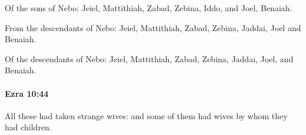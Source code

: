 			\begin{versebox}
					\item[BHS] 
					\item[LXX] 
					\item[ASV] Of the sons of Nebo: Jeiel, Mattithiah, Zabad, Zebina, Iddo, and Joel, Benaiah.
					\item[NIV] From the descendants of Nebo: Jeiel, Mattithiah, Zabad, Zebina, Jaddai, Joel and Benaiah.
					\item[NRSV] Of the descendants of Nebo: Jeiel, Mattithiah, Zabad, Zebina, Jaddai, Joel, and Benaiah.
			\end{versebox}

		\paragraph{Ezra 10:44} %
			\label{EZRA-10-44}

			All these had taken strange wives: and some of them had wives by whom they had children.


